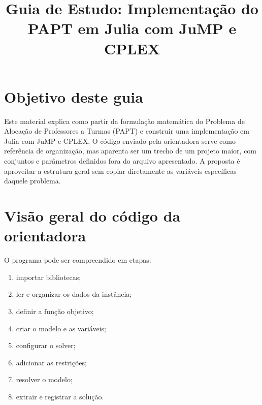 \documentclass[11pt,a4paper]{article}
\title{Guia de Estudo: Implementação do PAPT em Julia com JuMP e CPLEX}
\author{}
\date{}
\begin{document}
\maketitle
\tableofcontents
\newpage

\section{Objetivo deste guia}
Este material explica como partir da formulação matemática do Problema de Alocação de Professores a Turmas (PAPT) e construir uma implementação em Julia com JuMP e CPLEX. O código enviado pela orientadora serve como referência de organização, mas aparenta ser um trecho de um projeto maior, com conjuntos e parâmetros definidos fora do arquivo apresentado. A proposta é aproveitar a estrutura geral sem copiar diretamente as variáveis específicas daquele problema.

\section{Visão geral do código da orientadora}
O programa pode ser compreendido em etapas:
\begin{enumerate}
\item importar bibliotecas;
\item ler e organizar os dados da instância;
\item definir a função objetivo;
\item criar o modelo e as variáveis;
\item configurar o solver;
\item adicionar as restrições;
\item resolver o modelo;
\item extrair e registrar a solução.
\end{enumerate}
\end{document}
